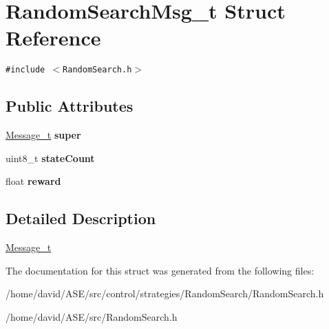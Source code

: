 \hypertarget{structRandomSearchMsg__t}{
\section{RandomSearchMsg\_\-t Struct Reference}
\label{structRandomSearchMsg__t}
}
{\tt \#include $<$RandomSearch.h$>$}

\subsection*{Public Attributes}
\begin{CompactItemize}
\item 
\hypertarget{structRandomSearchMsg__t_f8bfd8028f8d4f4cd7761030f9ebd0a1}{
\hyperlink{structMessage__t}{Message\_\-t} \textbf{super}}
\label{structRandomSearchMsg__t_f8bfd8028f8d4f4cd7761030f9ebd0a1}

\item 
\hypertarget{structRandomSearchMsg__t_ffbedc14e8f408e9824159bbbb8e3170}{
uint8\_\-t \textbf{stateCount}}
\label{structRandomSearchMsg__t_ffbedc14e8f408e9824159bbbb8e3170}

\item 
\hypertarget{structRandomSearchMsg__t_011917a8cdc8c0c068e5dbdcff644130}{
float \textbf{reward}}
\label{structRandomSearchMsg__t_011917a8cdc8c0c068e5dbdcff644130}

\end{CompactItemize}


\subsection{Detailed Description}
\hyperlink{structMessage__t}{Message\_\-t} 

The documentation for this struct was generated from the following files:\begin{CompactItemize}
\item 
/home/david/ASE/src/control/strategies/RandomSearch/RandomSearch.h\item 
/home/david/ASE/src/RandomSearch.h\end{CompactItemize}
